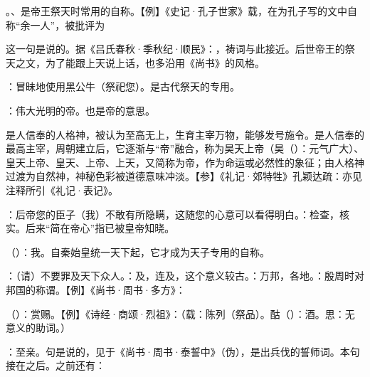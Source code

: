{\begin{lyitemize}
\item {}。、是帝王祭天时常用的自称。【例】《史记·孔子世家》载，在为孔子写的文中自称“余一人”，被批评为

这一句是说的。据《吕氏春秋·季秋纪·顺民》：，祷词与此接近。后世帝王的祭天之文，为了能跟上天说上话，也多沿用《尚书》的风格。

\item {}：冒昧地使用黑公牛（祭祀您）。是古代祭天的专用。
\item {}：伟大光明的帝。也是帝的意思。

是人信奉的人格神，被认为至高无上，生育主宰万物，能够发号施令。是人信奉的最高主宰，周朝建立后，它逐渐与“帝”融合，称为昊天上帝（昊（）：元气广大）、皇天上帝、皇天、上帝、上天，又简称为帝，作为命运或必然性的象征；由人格神过渡为自然神，神秘色彩被道德意味冲淡。【参】《礼记·郊特牲》孔颖达疏：亦见  注释所引《礼记·表记》。

\item {}：后帝您的臣子（我）不敢有所隐瞒，这随您的心意可以看得明白。：检查，核实。后来“简在帝心”指已被皇帝知晓。
\item {}（）：我。自秦始皇统一天下起，它才成为天子专用的自称。
\item {}：（请）不要罪及天下众人。：及，连及，这个意义较古。：万邦，各地。：殷周时对邦国的称谓。【例】《尚书·周书·多方》：
\item {}（）：赏赐。【例】《诗经·商颂·烈祖》：（载：陈列（祭品）。酤（）：酒。思：无意义的助词。）
\item {}：至亲。句是说的，见于《尚书·周书·泰誓中》（伪），是出兵伐的誓师词。本句接在之后。之前还有：


\end{lyitemize}}
